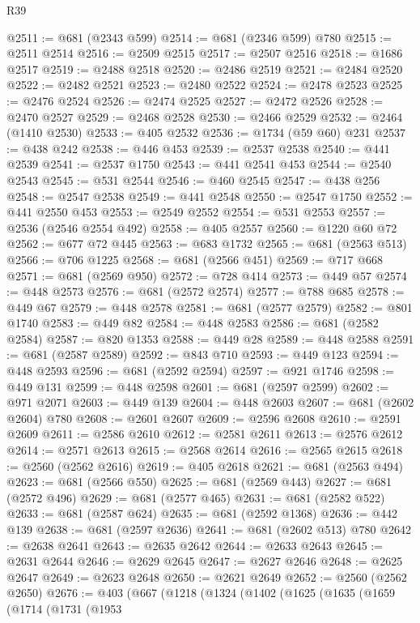 \begin{lexlean}{R39}
\begin{coremodule}
@2511 := @681 (@2343 @599)
@2514 := @681 (@2346 @599) @780
@2515 := @2511 @2514
@2516 := @2509 @2515
@2517 := @2507 @2516
@2518 := @1686 @2517
@2519 := @2488 @2518
@2520 := @2486 @2519
@2521 := @2484 @2520
@2522 := @2482 @2521
@2523 := @2480 @2522
@2524 := @2478 @2523
@2525 := @2476 @2524
@2526 := @2474 @2525
@2527 := @2472 @2526
@2528 := @2470 @2527
@2529 := @2468 @2528
@2530 := @2466 @2529
@2532 := @2464 (@1410 @2530)
@2533 := @405 @2532
@2536 := @1734 (@59 @60) @231
@2537 := @438 @242
@2538 := @446 @453
@2539 := @2537 @2538
@2540 := @441 @2539
@2541 := @2537 @1750
@2543 := @441 @2541 @453
@2544 := @2540 @2543
@2545 := @531 @2544
@2546 := @460 @2545
@2547 := @438 @256
@2548 := @2547 @2538
@2549 := @441 @2548
@2550 := @2547 @1750
@2552 := @441 @2550 @453
@2553 := @2549 @2552
@2554 := @531 @2553
@2557 := @2536 (@2546 @2554 @492)
@2558 := @405 @2557
@2560 := @1220 @60 @72
@2562 := @677 @72 @445
@2563 := @683 @1732
@2565 := @681 (@2563 @513)
@2566 := @706 @1225
@2568 := @681 (@2566 @451)
@2569 := @717 @668
@2571 := @681 (@2569 @950)
@2572 := @728 @414
@2573 := @449 @57
@2574 := @448 @2573
@2576 := @681 (@2572 @2574)
@2577 := @788 @685
@2578 := @449 @67
@2579 := @448 @2578
@2581 := @681 (@2577 @2579)
@2582 := @801 @1740
@2583 := @449 @82
@2584 := @448 @2583
@2586 := @681 (@2582 @2584)
@2587 := @820 @1353
@2588 := @449 @28
@2589 := @448 @2588
@2591 := @681 (@2587 @2589)
@2592 := @843 @710
@2593 := @449 @123
@2594 := @448 @2593
@2596 := @681 (@2592 @2594)
@2597 := @921 @1746
@2598 := @449 @131
@2599 := @448 @2598
@2601 := @681 (@2597 @2599)
@2602 := @971 @2071
@2603 := @449 @139
@2604 := @448 @2603
@2607 := @681 (@2602 @2604) @780
@2608 := @2601 @2607
@2609 := @2596 @2608
@2610 := @2591 @2609
@2611 := @2586 @2610
@2612 := @2581 @2611
@2613 := @2576 @2612
@2614 := @2571 @2613
@2615 := @2568 @2614
@2616 := @2565 @2615
@2618 := @2560 (@2562 @2616)
@2619 := @405 @2618
@2621 := @681 (@2563 @494)
@2623 := @681 (@2566 @550)
@2625 := @681 (@2569 @443)
@2627 := @681 (@2572 @496)
@2629 := @681 (@2577 @465)
@2631 := @681 (@2582 @522)
@2633 := @681 (@2587 @624)
@2635 := @681 (@2592 @1368)
@2636 := @442 @139
@2638 := @681 (@2597 @2636)
@2641 := @681 (@2602 @513) @780
@2642 := @2638 @2641
@2643 := @2635 @2642
@2644 := @2633 @2643
@2645 := @2631 @2644
@2646 := @2629 @2645
@2647 := @2627 @2646
@2648 := @2625 @2647
@2649 := @2623 @2648
@2650 := @2621 @2649
@2652 := @2560 (@2562 @2650)
@2676 := @403
    (@667
      (@1218
        (@1324
          (@1402
            (@1625
              (@1635
                (@1659
                  (@1714
                    (@1731
                      (@1953

\end{coremodule}
\end{lexlean}
